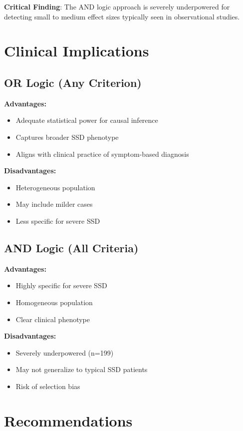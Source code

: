 \documentclass[11pt]{article}
\begin{document}
\textcolor{alertred}{\textbf{Critical Finding}: The AND logic approach is severely underpowered for detecting small to medium effect sizes typically seen in observational studies.}

\section{Clinical Implications}

\subsection{OR Logic (Any Criterion)}
\textbf{Advantages:}
\begin{itemize}
    \item Adequate statistical power for causal inference
    \item Captures broader SSD phenotype
    \item Aligns with clinical practice of symptom-based diagnosis
\end{itemize}

\textbf{Disadvantages:}
\begin{itemize}
    \item Heterogeneous population
    \item May include milder cases
    \item Less specific for severe SSD
\end{itemize}

\subsection{AND Logic (All Criteria)}
\textbf{Advantages:}
\begin{itemize}
    \item Highly specific for severe SSD
    \item Homogeneous population
    \item Clear clinical phenotype
\end{itemize}

\textbf{Disadvantages:}
\begin{itemize}
    \item \textcolor{alertred}{Severely underpowered (n=199)}
    \item May not generalize to typical SSD patients
    \item Risk of selection bias
\end{itemize}

\section{Recommendations}
\end{document}
